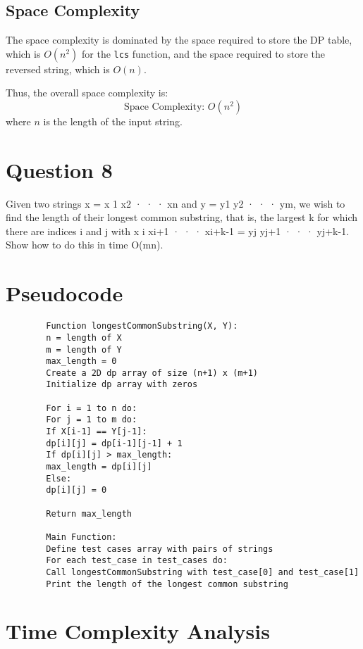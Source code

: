 \documentclass[a4paper,12pt]{report}
\begin{document}
\subsection*{Space Complexity}

The space complexity is dominated by the space required to store the DP table, which is \(O(n^2)\) for the \texttt{lcs} function, and the space required to store the reversed string, which is \(O(n)\).

Thus, the overall space complexity is:
\[
\text{Space Complexity: } O(n^2)
\]
where \(n\) is the length of the input string.

\newpage
\section*{Question 8}
Given two strings x = x 1 x2 · · · xn and y = y1 y2 · · · ym, we wish to find the length of their longest common substring, that is, the largest k for which there are indices i and j with x i xi+1 · · · xi+k-1 = yj yj+1 · · · yj+k-1. Show how to do this in time O(mn).


\section*{Pseudocode}

\begin{tcolorbox}[colback=white, colframe=black, boxrule=0.5pt]
	\ttfamily\small
	\begin{verbatim}
		Function longestCommonSubstring(X, Y):
		n = length of X
		m = length of Y
		max_length = 0
		Create a 2D dp array of size (n+1) x (m+1)
		Initialize dp array with zeros
		
		For i = 1 to n do:
		For j = 1 to m do:
		If X[i-1] == Y[j-1]:
		dp[i][j] = dp[i-1][j-1] + 1
		If dp[i][j] > max_length:
		max_length = dp[i][j]
		Else:
		dp[i][j] = 0
		
		Return max_length
		
		Main Function:
		Define test cases array with pairs of strings
		For each test_case in test_cases do:
		Call longestCommonSubstring with test_case[0] and test_case[1]
		Print the length of the longest common substring
	\end{verbatim}
\end{tcolorbox}

\section*{Time Complexity Analysis}
\end{document}
